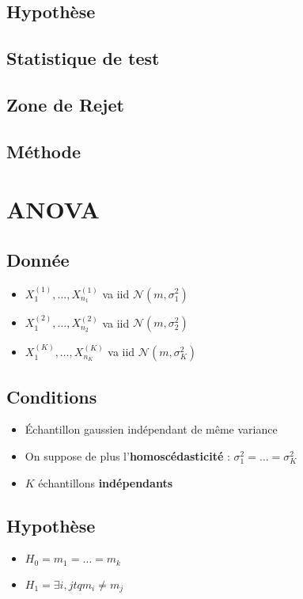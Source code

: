 \documentclass{article}
\theoremstyle{plain}%
\theoremstyle{definition}
\theoremstyle{remark}
\begin{document}
\subsection*{Hypothèse}
\subsection*{Statistique de test}
\subsection*{Zone de Rejet}
\subsection*{Méthode}

\section{ANOVA}
\subsection*{Donnée}
\begin{itemize}
    \item $ X_1^{(1)}, \dots, X_{n_1}^{(1)} $ va iid $ \mathcal{N}(m, \sigma_{1} ^2) $ 
    \item $ X_1^{(2)}, \dots, X_{n_2}^{(2)} $ va iid $ \mathcal{N}(m, \sigma_{2} ^2) $ 
    \item $ X_1^{(K)}, \dots, X_{n_K}^{(K)} $ va iid $ \mathcal{N}(m, \sigma_{K} ^2) $
\end{itemize}

\subsection*{Conditions}
\begin{itemize}
    \item Échantillon gaussien indépendant de même variance
    \item On suppose de plus l'\textbf{homoscédasticité} : $ \sigma _1^2 = \dots = \sigma _K^2 $ 
    \item $ K $ échantillons \textbf{indépendants}
\end{itemize}

\subsection*{Hypothèse}
\begin{itemize}
    \item $ H_0 = m_1 = \dots = m_k $ 
    \item $ H_1 = \exists i,j tq m_i \neq m_j $ 
\end{itemize}
\end{document}
